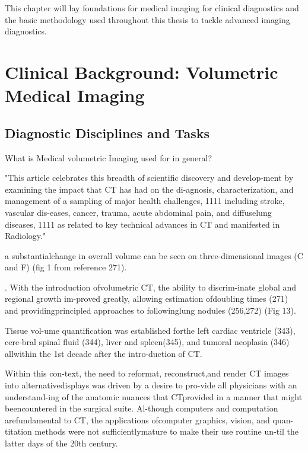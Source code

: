 This chapter will lay foundations for medical imaging for clinical diagnostics and the basic methodology used throughout this thesis to tackle advanced imaging diagnostics.

\section{Clinical Background: Volumetric Medical Imaging} %


    \subsection{Diagnostic Disciplines and Tasks} %
        What is Medical volumetric Imaging used for in general?


        "This article celebrates this breadth of scientific discovery and develop-ment by examining the impact that CT has had on the di-agnosis, characterization, and management of a sampling of major health challenges,
        1111 including stroke, vascular dis-eases, cancer, trauma, acute abdominal pain, and diffuselung diseases, 1111
        as related to key technical advances in CT and manifested in Radiology." \cite{rubin2014computed}

        a substantialchange in overall volume can be seen on three-dimensional images (C and F) (fig 1 from reference 271). \cite{rubin2014computed}

        . With the introduction ofvolumetric CT, the ability to discrim-inate global and regional growth im-proved greatly, allowing estimation ofdoubling times (271) and providingprincipled approaches to followinglung nodules (256,272) (Fig 13). \cite{rubin2014computed}


        Tissue vol-ume quantification was established forthe left cardiac ventricle (343), cere-bral spinal fluid (344), liver and spleen(345), and tumoral neoplasia (346) allwithin the 1st decade after the intro-duction of CT. \cite{rubin2014computed}

        Within this con-text, the need to reformat, reconstruct,and render CT images into alternativedisplays was driven by a desire to pro-vide all physicians with an understand-ing of the anatomic nuances that CTprovided in a manner that might beencountered in the surgical suite. Al-though computers and computation arefundamental to CT, the applications ofcomputer graphics, vision, and quan-titation methods were not sufficientlymature to make their use routine un-til the latter days of the 20th century. \cite{rubin2014computed}


